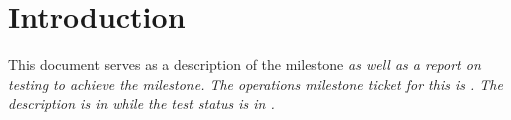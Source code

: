 
\section{Introduction}

This document serves as a description of the milestone \it{\milestone} as well as a report on testing to achieve the milestone.
The operations milestone ticket for this is  .
The description is in  while the test status is in .






